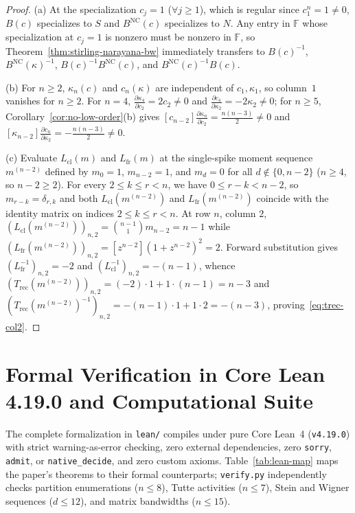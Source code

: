 \documentclass[11pt,a4paper]{article}
\theoremstyle{definition}
\theoremstyle{remark}
\newcommand{\NC}{\mathrm{NC}}
\newcommand{\cl}{\mathrm{cl}}
\newcommand{\fr}{\mathrm{fr}}
\begin{document}
\begin{proof}
(a) At the specialization $c_j = 1$ ($\forall j \ge 1$), which is regular since $c_1^n = 1 \ne 0$, $B(c)$ specializes to $S$ and $B^{\NC}(c)$ specializes to $N$. Any entry in $\mathbb{F}$ whose specialization at $c_j = 1$ is nonzero must be nonzero in $\mathbb{F}$, so Theorem~\ref{thm:stirling-narayana-bw} immediately transfers to $B(c)^{-1}$, $B^{\NC}(\kappa)^{-1}$, $B(c)^{-1}B^{\NC}(c)$, and $B^{\NC}(c)^{-1}B(c)$.

(b) For $n \ge 2$, $\kappa_n(c)$ and $c_n(\kappa)$ are independent of $c_1,\kappa_1$, so column~$1$ vanishes for $n \ge 2$. For $n = 4$, $\frac{\partial \kappa_4}{\partial c_2} = 2c_2 \ne 0$ and $\frac{\partial c_4}{\partial \kappa_2} = -2\kappa_2 \ne 0$; for $n \ge 5$, Corollary~\ref{cor:no-low-order}(b) gives $[c_{n-2}]\frac{\partial \kappa_n}{\partial c_2} = \frac{n(n-3)}{2} \ne 0$ and $[\kappa_{n-2}]\frac{\partial c_n}{\partial \kappa_2} = -\frac{n(n-3)}{2} \ne 0$.

(c) Evaluate $L_{\cl}(m)$ and $L_{\fr}(m)$ at the single-spike moment sequence $m^{(n-2)}$ defined by $m_0 = 1$, $m_{n-2} = 1$, and $m_d = 0$ for all $d \notin \{0,n-2\}$ ($n \ge 4$, so $n - 2 \ge 2$). For every $2 \le k \le r < n$, we have $0 \le r - k < n - 2$, so $m_{r-k} = \delta_{r,k}$ and both $L_{\cl}(m^{(n-2)})$ and $L_{\fr}(m^{(n-2)})$ coincide with the identity matrix on indices $2 \le k \le r < n$. At row $n$, column $2$, $(L_{\cl}(m^{(n-2)}))_{n,2} = \binom{n-1}{1}m_{n-2} = n - 1$ while $(L_{\fr}(m^{(n-2)}))_{n,2} = [z^{n-2}](1 + z^{n-2})^2 = 2$. Forward substitution gives $(L_{\fr}^{-1})_{n,2} = -2$ and $(L_{\cl}^{-1})_{n,2} = -(n-1)$, whence $(T_{\mathrm{rec}}(m^{(n-2)}))_{n,2} = (-2)\cdot 1 + 1\cdot(n-1) = n - 3$ and $(T_{\mathrm{rec}}(m^{(n-2)})^{-1})_{n,2} = -(n-1)\cdot 1 + 1\cdot 2 = -(n-3)$, proving~\eqref{eq:trec-col2}.
\end{proof}

\newpage
\section{Formal Verification in Core Lean 4.19.0 and Computational Suite}\label{sec:lean}

The complete formalization in \texttt{lean/} compiles under pure Core Lean~4 (\texttt{v4.19.0}) with strict warning-as-error checking, zero external dependencies, zero \texttt{sorry}, \texttt{admit}, or \texttt{native\_decide}, and zero custom axioms. Table~\ref{tab:lean-map} maps the paper's theorems to their formal counterparts; \texttt{verify.py} independently checks partition enumerations ($n \le 8$), Tutte activities ($n \le 7$), Stein and Wigner sequences ($d \le 12$), and matrix bandwidths ($n \le 15$).
\end{document}
